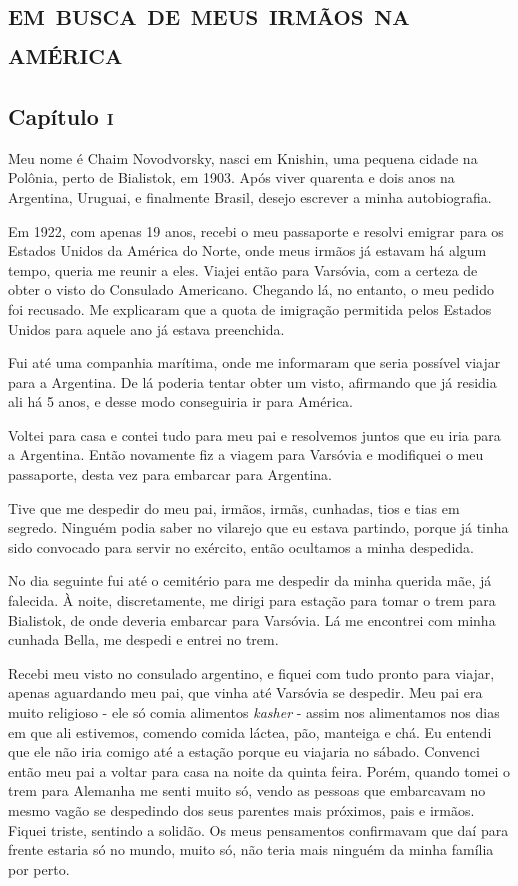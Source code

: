 \part[Em busca de meus irmãos na América]{\textsc{em busca de meus irmãos na américa}}

\chapter{Capítulo \textsc{i}}

Meu nome é Chaim Novodvorsky, nasci em Knishin, uma pequena cidade na
Polônia, perto de Bialistok, em 1903. Após viver quarenta e dois anos na
Argentina, Uruguai, e finalmente Brasil, desejo escrever a minha
autobiografia.

Em 1922, com apenas 19 anos, recebi o meu passaporte e resolvi emigrar
para os Estados Unidos da América do Norte, onde meus irmãos já estavam
há algum tempo, queria me reunir a eles. Viajei então para Varsóvia, com
a certeza de obter o visto do Consulado Americano. Chegando lá, no
entanto, o meu pedido foi recusado. Me explicaram que a quota de
imigração permitida pelos Estados Unidos para aquele ano já estava
preenchida.

Fui até uma companhia marítima, onde me informaram que seria possível
viajar para a Argentina. De lá poderia tentar obter um visto, afirmando
que já residia ali há 5 anos, e desse modo conseguiria ir para América.

Voltei para casa e contei tudo para meu pai e resolvemos juntos que eu
iria para a Argentina. Então novamente fiz a viagem para Varsóvia e
modifiquei o meu passaporte, desta vez para embarcar para Argentina.

Tive que me despedir do meu pai, irmãos, irmãs, cunhadas, tios e tias em
segredo. Ninguém podia saber no vilarejo que eu estava partindo, porque
já tinha sido convocado para servir no exército, então ocultamos a minha
despedida.

No dia seguinte fui até o cemitério para me despedir da minha querida
mãe, já falecida. À noite, discretamente, me dirigi para estação para
tomar o trem para Bialistok, de onde deveria embarcar para Varsóvia. Lá
me encontrei com minha cunhada Bella, me despedi e entrei no trem.

Recebi meu visto no consulado argentino, e fiquei com tudo pronto para
viajar, apenas aguardando meu pai, que vinha até Varsóvia se despedir.
Meu pai era muito religioso - ele só comia alimentos \textit{kasher} - assim nos
alimentamos nos dias em que ali estivemos, comendo comida láctea, pão,
manteiga e chá. Eu entendi que ele não iria comigo até a estação porque
eu viajaria no sábado. Convenci então meu pai a voltar para casa na
noite da quinta feira. Porém, quando tomei o trem para Alemanha me senti
muito só, vendo as pessoas que embarcavam no mesmo vagão se despedindo
dos seus parentes mais próximos, pais e irmãos. Fiquei triste, sentindo
a solidão. Os meus pensamentos confirmavam que daí para frente estaria
só no mundo, muito só, não teria mais ninguém da minha família por
perto.

